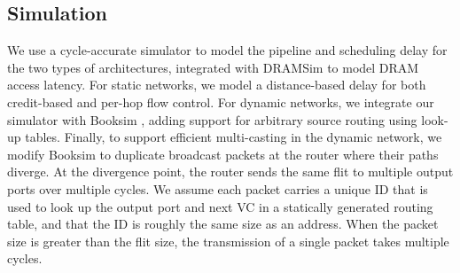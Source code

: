 \subsection{Simulation}
We use a cycle-accurate simulator to model the pipeline and scheduling delay for the two types of architectures,
 integrated with DRAMSim \cite{dramsim} to model DRAM access latency. For static networks, we model
a distance-based delay for both credit-based and per-hop flow control. 
For dynamic networks, we integrate
our simulator with Booksim \cite{jiang2013detailed}, adding support for arbitrary source routing using look-up tables. 
Finally, to support efficient multi-casting in the dynamic network, we modify Booksim to duplicate broadcast packets at the router where their paths diverge.
At the divergence point, the router sends the same flit to multiple output ports over multiple cycles.
We assume each packet carries a unique ID that is used to look up the output port and next VC in a statically generated routing table, and that the ID is roughly the same size as an address.
When the packet size is greater than the flit size, the transmission of a single packet takes multiple cycles.

